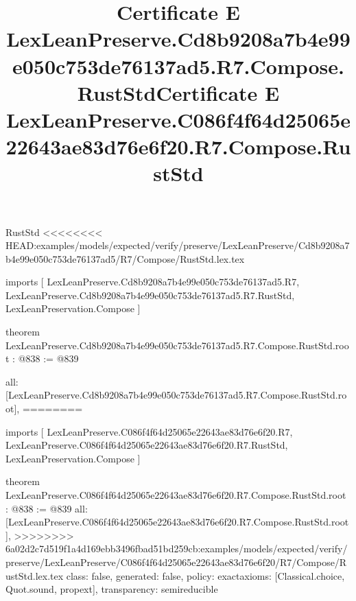 \begin{lexlean}{RustStd}
<<<<<<<< HEAD:examples/models/expected/verify/preserve/LexLeanPreserve/Cd8b9208a7b4e99e050c753de76137ad5/R7/Compose/RustStd.lex.tex
\title{Certificate E LexLeanPreserve.Cd8b9208a7b4e99e050c753de76137ad5.R7.Compose.RustStd}
\begin{coremodule}
imports [
  LexLeanPreserve.Cd8b9208a7b4e99e050c753de76137ad5.R7,
  LexLeanPreserve.Cd8b9208a7b4e99e050c753de76137ad5.R7.RustStd,
  LexLeanPreservation.Compose
]

theorem LexLeanPreserve.Cd8b9208a7b4e99e050c753de76137ad5.R7.Compose.RustStd.root : @838 := @839 {
  all: [LexLeanPreserve.Cd8b9208a7b4e99e050c753de76137ad5.R7.Compose.RustStd.root],
========
\title{Certificate E LexLeanPreserve.C086f4f64d25065e22643ae83d76e6f20.R7.Compose.RustStd}
\begin{coremodule}
imports [
  LexLeanPreserve.C086f4f64d25065e22643ae83d76e6f20.R7,
  LexLeanPreserve.C086f4f64d25065e22643ae83d76e6f20.R7.RustStd,
  LexLeanPreservation.Compose
]

theorem LexLeanPreserve.C086f4f64d25065e22643ae83d76e6f20.R7.Compose.RustStd.root : @838 := @839 {
  all: [LexLeanPreserve.C086f4f64d25065e22643ae83d76e6f20.R7.Compose.RustStd.root],
>>>>>>>> 6a02d2c7d519f1a4d169ebb3496fbad51bd259cb:examples/models/expected/verify/preserve/LexLeanPreserve/C086f4f64d25065e22643ae83d76e6f20/R7/Compose/RustStd.lex.tex
  class: false,
  generated: false,
  policy: exact{axioms: [Classical.choice, Quot.sound, propext]},
  transparency: semireducible
}


\end{coremodule}}
\end{coremodule}
\end{lexlean}
